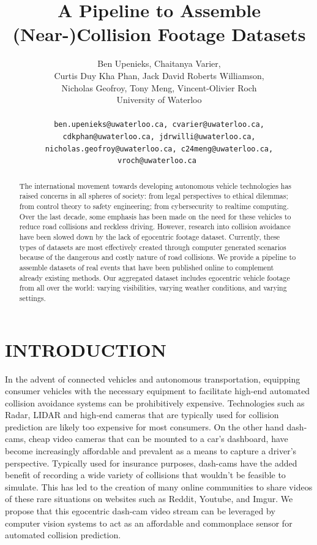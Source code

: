 \documentclass[letterpaper, 10 pt, conference]{IEEEconf}
\title{\LARGE \bf
A Pipeline to Assemble (Near-)Collision Footage Datasets
}
\author{
         Ben Upenieks, Chaitanya Varier,\\
         Curtis Duy Kha Phan, Jack David Roberts Williamson,\\
         Nicholas Geofroy, Tony Meng, Vincent-Olivier Roch\\
         University of Waterloo\\
         \\
         \tt\small ben.upenieks@uwaterloo.ca, cvarier@uwaterloo.ca,
         \\ \tt\small cdkphan@uwaterloo.ca, jdrwilli@uwaterloo.ca,
         \\ \tt\small nicholas.geofroy@uwaterloo.ca, c24meng@uwaterloo.ca, vroch@uwaterloo.ca
}
\begin{document}
\maketitle
\thispagestyle{empty}
\pagestyle{empty}


\begin{abstract}

The international movement towards developing autonomous vehicle technologies has raised concerns in all spheres of society: from legal perspectives to ethical dilemmas; from control theory to safety engineering; from cybersecurity to realtime computing. Over the
last decade, some emphasis has been made on the need for these vehicles to reduce road collisions and reckless driving. However, research into collision avoidance have been slowed down by the lack of egocentric footage dataset. Currently, these types of datasets are most effectively created through computer generated scenarios because of the dangerous and costly nature of road collisions. We provide a pipeline to assemble datasets of real events that have been published online to complement already existing methods. Our aggregated dataset includes egocentric vehicle footage from all over the world: varying visibilities, varying weather conditions, and varying settings.

\end{abstract}

\section{INTRODUCTION}

In the advent of connected vehicles and autonomous transportation, equipping consumer vehicles with the necessary equipment to facilitate high-end automated collision avoidance systems can be prohibitively expensive.
Technologies such as Radar, LIDAR and high-end cameras that are typically used for collision prediction are likely too expensive for most consumers.
On the other hand dash-cams, cheap video cameras that can be mounted to a car's dashboard, have become increasingly affordable and prevalent as a means to capture a driver’s perspective.
Typically used for insurance purposes, dash-cams have the added benefit of recording a wide variety of collisions that wouldn't be feasible to simulate. 
This has led to the creation of many online communities to share videos of these rare situations on websites such as Reddit, Youtube, and Imgur.
We propose that this egocentric dash-cam video stream can be leveraged by computer vision systems to act as an affordable and commonplace sensor for automated collision prediction. 
\end{document}
